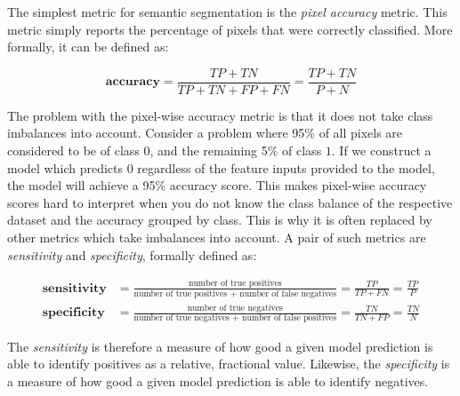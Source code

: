 The simplest metric for semantic segmentation is the \textit{pixel accuracy} metric.
This metric simply reports the percentage of pixels that were correctly classified.
More formally, it can be defined as:

\begin{equation*}
    \textbf{accuracy} = \frac{TP + TN}{TP + TN + FP + FN} = \frac{TP + TN}{P + N}
\end{equation*}

The problem with the pixel-wise accuracy metric is that it does not take class imbalances into account.
Consider a problem where 95\% of all pixels are considered to be of class $0$, and the remaining 5\% of class $1$.
If we construct a model which predicts $0$ regardless of the feature inputs provided to the model, the model will achieve a 95\% accuracy score.
This makes pixel-wise accuracy scores hard to interpret when you do not know the class balance of the respective dataset and the accuracy grouped by class.
This is why it is often replaced by other metrics which take imbalances into account.
A pair of such metrics are \textit{sensitivity} and \textit{specificity}, formally defined as:

\begin{align*}
    \textbf{sensitivity}
    &=
    \frac{\text{number of true positives}}{\text{number of true positives + number of false negatives}}
    =
    \frac{TP}{TP + FN}
    =
    \frac{TP}{P}
    \\
    \textbf{specificity}
    &=
    \frac{\text{number of true negatives}}{\text{number of true negatives + number of false positives}}
    =
    \frac{TN}{TN + FP}
    =
    \frac{TN}{N}
\end{align*}

The \textit{sensitivity} is therefore a measure of how good a given model prediction is able to identify positives as a relative, fractional value.
Likewise, the \textit{specificity} is a measure of how good a given model prediction is able to identify negatives.
